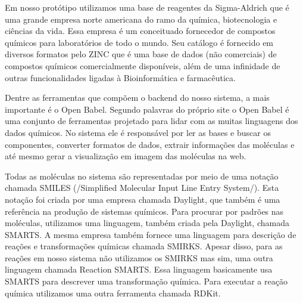\documentclass{abnt}
\begin{document}
Em nosso protótipo utilizamos uma base de reagentes da Sigma-Aldrich que é uma grande empresa norte americana do ramo da química, biotecnologia e ciências da vida. Essa empresa é um conceituado fornecedor de compostos químicos para laboratórios de todo o mundo. Seu catálogo é fornecido em diversos formatos pelo ZINC que é uma base de dados (não comerciais) de compostos químicos comercialmente disponíveis, além de uma infinidade de outras funcionalidades ligadas à Bioinformática e farmacêutica.

Dentre as ferramentas que compõem o backend do nosso sistema, a mais importante é o Open Babel. Segundo palavras do próprio site o Open Babel é uma conjunto de ferramentas projetado para lidar com as muitas linguagens dos dados químicos. No sistema ele é responsável por ler as bases e buscar os componentes, converter formatos de dados, extrair informações das moléculas e até mesmo gerar a visualização em imagem das moléculas na web.

Todas as moléculas no sistema são representadas por meio de uma notação chamada SMILES (/Simplified Molecular Input Line Entry System/). Esta notação foi criada por uma empresa chamada Daylight, que também é uma referência na produção de sistemas químicos. Para procurar por padrões nas moléculas, utilizamos uma linguagem, também criada pela Daylight, chamada SMARTS. A mesma empresa também fornece uma linguagem para descrição de reações e transformações químicas chamada SMIRKS. Apesar disso, para as reações em nosso sistema não utilizamos os SMIRKS mas sim, uma outra linguagem chamada Reaction SMARTS. Essa linguagem basicamente usa SMARTS para descrever uma transformação química. Para executar a reação química utilizamos uma outra ferramenta chamada RDKit.


\end{document}
